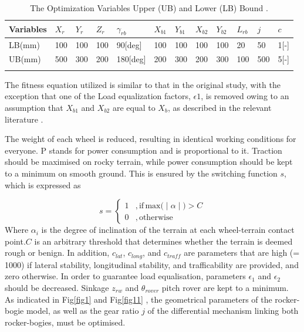 \documentclass[default,iicol]{sn-jnl}
\theoremstyle{thmstyleone}
\theoremstyle{thmstyletwo}
\theoremstyle{thmstylethree}
\begin{document}
\begin{table}[ht]
\begin{center}
\begin{minipage}{\textwidth}
\caption{The Optimization Variables Upper (UB) and Lower (LB) Bound \cite{bib1}.}\label{tab3}
\begin{tabular*}{\textwidth}{@{\extracolsep{\fill}}llllllllllll@{\extracolsep{\fill}}}
\toprule
Variables & $X_r$  & $Y_r$ & $Z_r$ &$\gamma_{rb}$ & $X_{b1}$ & $Y_{b1}$ & $X_{b2}$ &$Y_{b2}$ &$L_{rb}$ & $j$ & $c$  \\
\midrule
LB(mm)   & 100  &  100  & 100 & 90[deg] & 100 & 100 & 100 & 100  & 20 & 50 & 1[-]\\
UB(mm)   & 500  &  300  & 200 & 180[deg] & 200 & 300 & 200 & 300 &  100 & 500 & 5[-]\\
\botrule
\end{tabular*}
\end{minipage}
\end{center}
\end{table}

The fitness equation utilized is similar to that in the original study, with the exception that one of the Load equalization factors, $\epsilon 1$, is removed owing to an assumption that $X_{b1}$ and $X_{b2}$ are equal to $X_{b}$, as described in the relevant literature \cite{bib1}.

The weight of each wheel is reduced, resulting in identical working conditions for everyone. P stands for power consumption and is proportional to it. Traction should be maximised on rocky terrain, while power consumption should be kept to a minimum on smooth ground. This is ensured by the switching function $s$, which is expressed as 

\begin{equation}
\displaystyle   {s =\begin{cases}1 & , \mathrm{if\, max}  \big( \mid  \alpha  \mid \big)  > C \\0 & ,\mathrm{otherwise} 
\end{cases}}
\end{equation}
Where $\alpha_i$ is the degree of inclination of the terrain at each wheel-terrain contact point.$C$ is an arbitrary threshold that determines whether the terrain is deemed rough or benign. In addition, $c_{lat}$, $c_{long}$, and $c_{traff}$  are parameters that are high (= 1000) if lateral stability, longitudinal stability, and trafficability are provided, and zero otherwise. In order to guarantee load equalisation, parameters $\epsilon _1$ and $\epsilon _2$ should be decreased. Sinkage $z_{rw}$ and $\theta_{rover} $ pitch rover are kept to a minimum. As indicated in Fig\ref{fig1} and Fig\ref{fig11} , the geometrical parameters of the rocker-bogie model, as well as the gear ratio $j$  of the differential mechanism linking both rocker-bogies, must be optimised.
\end{document}
